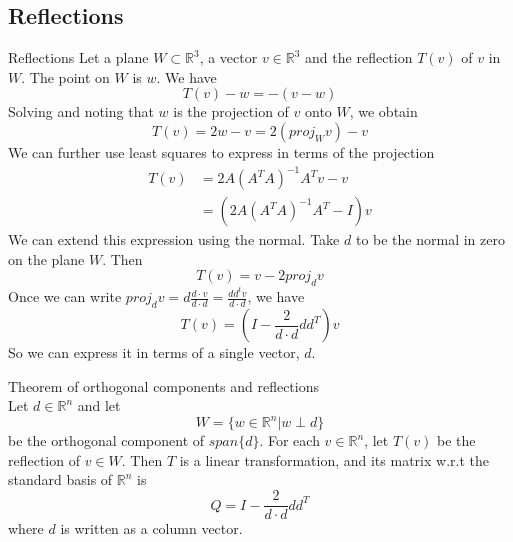 \documentclass[journal, letterpaper]{IEEEtran}
\begin{document}
    \subsection{Reflections}
    \begin{mybox}{Reflections}
        Let a plane $W \subset \mathbb{R}^3$, a vector $v \in \mathbb{R}^3$ and the reflection $T(v)$ of $v$ in $W$. The point on $W$ is $w$. We have
        $$ T(v) - w = -(v - w)$$
        Solving and noting that $w$ is the projection of $v$ onto $W$, we obtain
        $$ T(v) = 2w - v = 2(proj_W v) - v$$
        We can further use least squares to express in terms of the projection
        \begin{align*}
            T(v) &= 2A(A^TA)^{-1}A^Tv - v \\
            &= (2A(A^TA)^{-1}A^T - I)v
        \end{align*}
        We can extend this expression using the normal. Take $d$ to be the normal in zero on the plane $W$. Then 
        $$ T(v) = v - 2proj_d v$$
        Once we can write $proj_dv = d\frac{d\cdot v}{d\cdot d} = \frac{dd^tv}{d\cdot d}$, we have
        $$ T(v) = (I - \frac{2}{d\cdot d}dd^T)v$$
        So we can express it in terms of a single vector, $d$.
    \end{mybox}
    \begin{myboxr}{Theorem of orthogonal components and reflections} \\ 
        Let $d \in \mathbb{R}^n$ and let 
        $$ W = \{w \in \mathbb{R}^n | w \perp d \}$$
        be the orthogonal component of $span\{d\}$. For each $v \in \mathbb{R}^n$, let $T(v)$ be the reflection of $v \in W$. Then $T$ is a linear transformation, and its matrix w.r.t the standard basis of $\mathbb{R}^n$ is
        $$ Q = I - \frac{2}{d \cdot d}dd^T$$
        where $d$ is written as a column vector.
    \end{myboxr}
\end{document}
